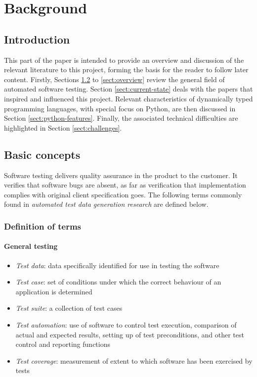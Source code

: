 \documentclass{icldt}
\numberwithin{equation}{section}       %
\begin{document}
\chapter{Background}
\label{ch:background}
\section{Introduction}
This part of the paper is intended to provide an overview and discussion of the relevant literature to this project, forming the basis for the reader to follow later content. Firstly, Sections \ref{sect:basics} to \ref{sect:overview} review the general field of automated software testing. Section \ref{sect:current-state} deals with the papers that inspired and influenced this project. Relevant characteristics of dynamically typed programming languages, with special focus on Python, are then discussed in Section \ref{sect:python-features}. Finally, the associated technical difficulties are highlighted in Section \ref{sect:challenges}.
\section{Basic concepts}
\label{sect:basics}
Software testing delivers quality assurance in the product to the customer. It verifies that software bugs are absent, as far as verification that implementation complies with original client specification goes. The following terms commonly found in \emph{automated test data generation research} are defined below.

\subsection{Definition of terms}
\subsubsection{General testing}
\begin{itemize}
	\item \emph{Test data}: data specifically identified for use in testing the software
	\item \emph{Test case}: set of conditions under which the correct behaviour of an application is determined
	\item \emph{Test suite}: a collection of test cases
	\item \emph{Test automation}: use of software to control test execution, comparison of actual and expected results, setting up of test preconditions, and other test control and reporting functions
	\item \emph{Test coverage}: measurement of extent to which software has been exercised by tests
\end{itemize}
\end{document}
